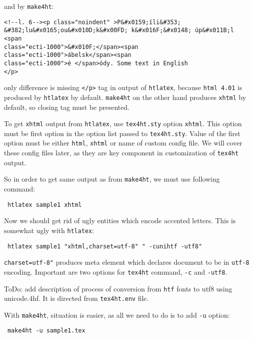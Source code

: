 and by \texttt{make4ht}:

\begin{verbatim}
<!--l. 6--><p class="noindent" >P&#x0159;íli&#353; &#382;lu&#x0165;ou&#x010D;k&#x00FD; k&#x016F;&#x0148; úp&#x011B;l <span 
class="ecti-1000">&#x010F;</span><span 
class="ecti-1000">ábelsk</span><span 
class="ecti-1000">é </span>ódy. Some text in English
</p> 
\end{verbatim}

only difference is missing \texttt{\textless{}/p\textgreater{}} tag in
output of \texttt{htlatex}, because \texttt{html\ 4.01} is produced by
\texttt{htlatex} by default. \texttt{make4ht} on the other hand produces
\texttt{xhtml} by default, so closing tag must be presented.

To get \texttt{xhtml} output from \texttt{htlatex}, use
\texttt{tex4ht.sty} option \texttt{xhtml}. This option must be first
option in the option list passed to \texttt{tex4ht.sty}. Value of the
first option must be either \texttt{html}, \texttt{xhtml} or name of
custom config file. We will cover these config files later, as they are
key component in customization of \texttt{tex4ht} output.

So in order to get same output as from \texttt{make4ht}, we must use
following command:

\begin{verbatim}
 htlatex sample1 xhtml
\end{verbatim}

Now we should get rid of ugly entities which encode accented letters.
This is somewhat ugly with \texttt{htlatex}:

\begin{verbatim}
 htlatex sample1 "xhtml,charset=utf-8" " -cunihtf -utf8"
\end{verbatim}

\texttt{charset=utf-8"} produces meta element which declares document to
be in \texttt{utf-8} encoding. Important are two options for
\texttt{tex4ht} command, \texttt{-c} and \texttt{-utf8}.

ToDo: add description of process of conversion from \texttt{htf} fonts
to utf8 using unicode.4hf. It is directed from \texttt{tex4ht.env} file.

With \texttt{make4ht}, situation is easier, as all we need to do is to
add \texttt{-u} option:

\begin{verbatim}
 make4ht -u sample1.tex
\end{verbatim}

